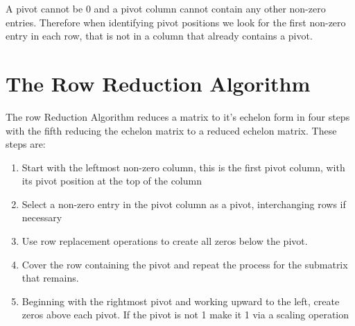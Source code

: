\documentclass[12pt letter]{report}
\begin{document}
A pivot cannot be 0 and a pivot column cannot contain any other non-zero entries. Therefore when identifying pivot
positions we look for the first non-zero entry in each row, that is not in a column that already contains a pivot.


\section{The Row Reduction Algorithm}

The row Reduction Algorithm reduces a matrix to it's echelon form in four steps with the fifth reducing the echelon
matrix to a reduced echelon matrix. These steps are:
\begin{enumerate}
  \item Start with the leftmost non-zero column, this is the first pivot column, with its pivot position at the top of
        the column
  \item Select a non-zero entry in the pivot column as a pivot, interchanging rows if necessary
  \item Use row replacement operations to create all zeros below the pivot.
  \item Cover the row containing the pivot and repeat the process for the submatrix that remains.
  \item Beginning with the rightmost pivot and working upward to the left, create zeros above each pivot. If the pivot
        is not 1 make it 1 via a scaling operation
\end{enumerate}
\end{document}
